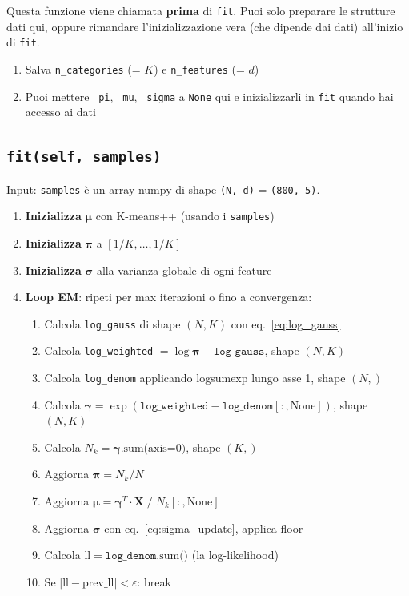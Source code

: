 \documentclass[11pt,a4paper]{article}
\begin{document}
Questa funzione viene chiamata \textbf{prima} di \texttt{fit}. Puoi solo preparare le strutture dati qui, oppure rimandare l'inizializzazione vera (che dipende dai dati) all'inizio di \texttt{fit}.

\begin{enumerate}
    \item Salva \texttt{n\_categories} (= $K$) e \texttt{n\_features} (= $d$)
    \item Puoi mettere \texttt{\_pi}, \texttt{\_mu}, \texttt{\_sigma} a \texttt{None} qui e inizializzarli in \texttt{fit} quando hai accesso ai dati
\end{enumerate}

\subsection{\texttt{fit(self, samples)}}

Input: \texttt{samples} \`e un array numpy di shape \texttt{(N, d)} = \texttt{(800, 5)}.

\begin{enumerate}
    \item \textbf{Inizializza} $\boldsymbol{\mu}$ con K-means++ (usando i \texttt{samples})
    \item \textbf{Inizializza} $\boldsymbol{\pi}$ a $[1/K, \ldots, 1/K]$
    \item \textbf{Inizializza} $\boldsymbol{\sigma}$ alla varianza globale di ogni feature
    \item \textbf{Loop EM}: ripeti per max iterazioni o fino a convergenza:
    \begin{enumerate}[label=\roman*.]
        \item Calcola \texttt{log\_gauss} di shape $(N, K)$ con eq.~\eqref{eq:log_gauss}
        \item Calcola \texttt{log\_weighted} $= \log\boldsymbol{\pi} + \texttt{log\_gauss}$, shape $(N, K)$
        \item Calcola \texttt{log\_denom} applicando logsumexp lungo asse 1, shape $(N,)$
        \item Calcola $\boldsymbol{\gamma} = \exp(\texttt{log\_weighted} - \texttt{log\_denom}[:, \text{None}])$, shape $(N, K)$
        \item Calcola $N_k = \boldsymbol{\gamma}.\text{sum(axis=0)}$, shape $(K,)$
        \item Aggiorna $\boldsymbol{\pi} = N_k / N$
        \item Aggiorna $\boldsymbol{\mu} = \boldsymbol{\gamma}^T \cdot \mathbf{X} \;/\; N_k[:, \text{None}]$
        \item Aggiorna $\boldsymbol{\sigma}$ con eq.~\eqref{eq:sigma_update}, applica floor
        \item Calcola $\text{ll} = \texttt{log\_denom}.\text{sum()}$ (la log-likelihood)
        \item Se $|\text{ll} - \text{prev\_ll}| < \varepsilon$: break
    \end{enumerate}
\end{enumerate}
\end{document}
